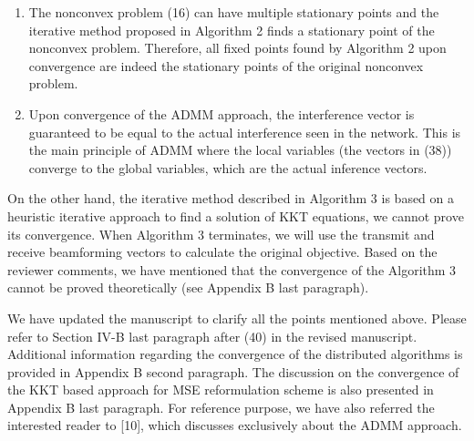 \begin{enumerate}
\begin{enumerate}
	\item The nonconvex problem (16) can have multiple stationary points and the iterative method proposed in Algorithm 2 finds a stationary point of the nonconvex problem. Therefore, all fixed points found by Algorithm 2 upon convergence are indeed the stationary points of the original nonconvex problem.
		
	\item Upon convergence of the \ac{ADMM} approach, the interference vector is guaranteed to be equal to the actual interference seen in the network. This is the main principle of \ac{ADMM} where the local variables (the vectors in (38)) converge to the global variables, which are the actual inference vectors.
	
\end{enumerate}

On the other hand, the iterative method described in Algorithm 3 is based on a heuristic iterative approach to find a solution of \ac{KKT} equations, we cannot prove its convergence. When Algorithm 3 terminates, we will use the transmit and receive beamforming vectors to calculate the original objective. Based on the reviewer comments, we have mentioned that the convergence of the Algorithm 3 cannot be proved theoretically (see Appendix B last paragraph).

We have updated the manuscript to clarify all the points mentioned above. Please refer to Section IV-B last paragraph after (40) in the revised manuscript. Additional information regarding the convergence of the distributed algorithms is provided in Appendix B second paragraph. The discussion on the convergence of the KKT based approach for MSE reformulation scheme is also presented in Appendix B last paragraph. For reference purpose, we have also referred the interested reader to [10], which discusses exclusively about the \ac{ADMM} approach.


\end{enumerate}
